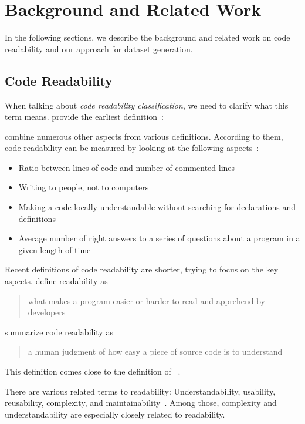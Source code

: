 \documentclass[%
class=scrreprt,
chapterprefix=false,%
open=right,%
twoside=true,%
paper=a4,%
logofile={Logo\_zentral\_farbig\_EN.png},%
thesistype=master,%
UKenglish,%
]{se2thesis}
\theoremstyle{definition}
\begin{document}
\chapter{Background and Related Work} \label{Background and Related Work}
	In the following sections, we describe the background and related work on code readability and our approach for dataset generation.
	
\section{Code Readability} \label{Code Readability}
	
	When talking about \textit{code readability classification}, we need to clarify what this term means.
	\citeauthor{buse2009learning} provide the earliest definition~\cite{buse2009learning}:

	\citeauthor{tashtoush2013impact} combine numerous other aspects from various definitions. According to them, code readability can be measured by looking at the following aspects~\cite{tashtoush2013impact}:
	\begin{itemize}
		\item Ratio between lines of code and number of commented lines
		\item Writing to people, not to computers
		\item Making a code locally understandable without searching for declarations and definitions
		\item Average number of right answers to a series of questions about a program in a given length of time
	\end{itemize}
	
	Recent definitions of code readability are shorter, trying to focus on the key aspects. \citeauthor{oliveira2020evaluating} define readability as
	\blockcquote{oliveira2020evaluating}{what makes a program easier or harder to read and apprehend by developers}.
			
	\citeauthor{mi2021effectiveness} summarize code readability as \blockcquote{mi2021effectiveness}{a human judgment of how easy a piece of source code is to understand}. This definition comes close to the definition of \citeauthor{buse2009learning}~\cite{buse2009learning}.
	
	There are various related terms to readability: Understandability, usability, reusability, complexity, and maintainability~\cite{tashtoush2013impact}. Among those, complexity and understandability are especially closely related to readability.
	
\end{document}
